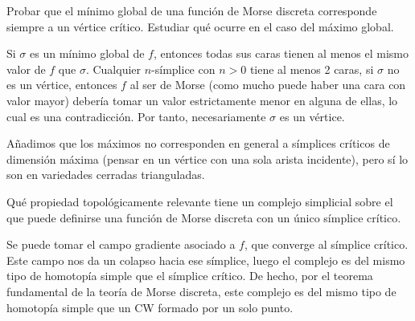 \documentclass[twoside]{article}
\begin{document}
\newpage

\begin{ejercicio}{3}
Probar que el mínimo global de una función de Morse discreta corresponde siempre a un vértice crítico. Estudiar qué ocurre en el caso del máximo global.
\end{ejercicio}
\begin{solucion}
Si $\sigma$ es un mínimo global de $f$, entonces todas sus caras tienen al menos el mismo valor de $f$ que $\sigma$. Cualquier $n$-símplice con $n>0$ tiene al menos 2 caras, si $\sigma$ no es un vértice, entonces $f$ al ser de Morse (como mucho puede haber una cara con valor mayor) debería tomar un valor estrictamente menor en alguna de ellas, lo cual es una contradicción. Por tanto, necesariamente $\sigma$ es un vértice. 

Añadimos que los máximos no corresponden en general a símplices críticos de dimensión máxima (pensar en un vértice con una sola arista incidente), pero sí lo son en variedades cerradas trianguladas. 
\end{solucion}

\newpage

\begin{ejercicio}{4}
Qué propiedad topológicamente relevante tiene un complejo simplicial sobre el que puede definirse una función de Morse discreta con un único símplice crítico.
\end{ejercicio}
\begin{solucion}
Se puede tomar el campo gradiente asociado a $f$, que converge al símplice crítico. Este campo nos da un colapso hacia ese símplice, luego el complejo es del mismo tipo de homotopía simple que el símplice crítico. De hecho, por el teorema fundamental de la teoría de Morse discreta, este complejo es del mismo tipo de homotopía simple que un CW formado por un solo punto. 
\end{solucion}

\newpage
\end{document}

